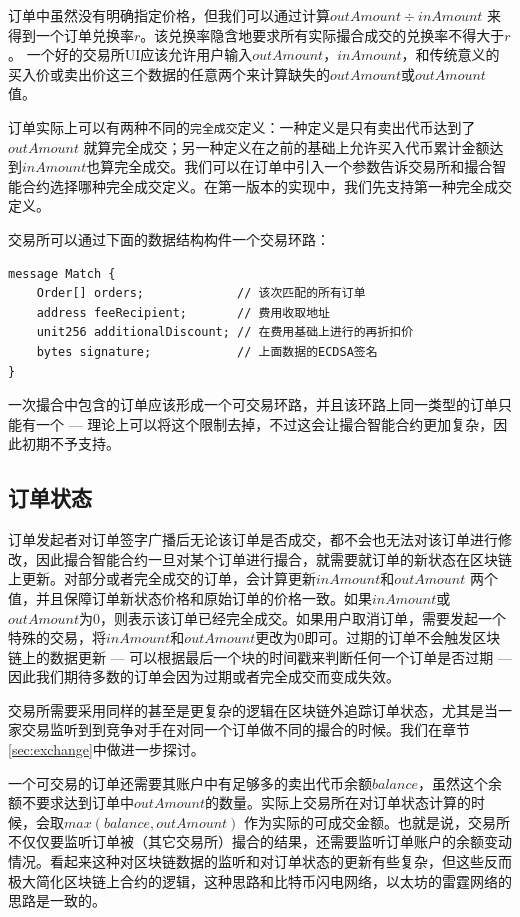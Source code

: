 \documentclass[UTF8,nofonts]{ctexart}
\begin{document}
订单中虽然没有明确指定价格，但我们可以通过计算$outAmount \div inAmount$ 来得到一个订单兑换率$r$。该兑换率隐含地要求所有实际撮合成交的兑换率不得大于$r$。 一个好的交易所UI应该允许用户输入$outAmount$，$inAmount$，和传统意义的买入价或卖出价这三个数据的任意两个来计算缺失的$outAmount$或$outAmount$值。

订单实际上可以有两种不同的\texttt{完全成交}定义：一种定义是只有卖出代币达到了$outAmount$ 就算完全成交；另一种定义在之前的基础上允许买入代币累计金额达到$inAmount$也算完全成交。我们可以在订单中引入一个参数告诉交易所和撮合智能合约选择哪种完全成交定义。在第一版本的实现中，我们先支持第一种完全成交定义。


交易所可以通过下面的数据结构构件一个交易环路：
\begin{verbatim}
message Match {
    Order[] orders;             // 该次匹配的所有订单
    address feeRecipient;       // 费用收取地址
    unit256 additionalDiscount; // 在费用基础上进行的再折扣价
    bytes signature;            // 上面数据的ECDSA签名
}
\end{verbatim}

一次撮合中包含的订单应该形成一个可交易环路，并且该环路上同一类型的订单只能有一个 --- 理论上可以将这个限制去掉，不过这会让撮合智能合约更加复杂，因此初期不予支持。

\subsection{订单状态\label{sec:orderstate}}

订单发起者对订单签字广播后无论该订单是否成交，都不会也无法对该订单进行修改，因此撮合智能合约一旦对某个订单进行撮合，就需要就订单的新状态在区块链上更新。对部分或者完全成交的订单，会计算更新$inAmount$和$outAmount$ 两个值，并且保障订单新状态价格和原始订单的价格一致。如果$inAmount$或$outAmount$为0，则表示该订单已经完全成交。如果用户取消订单，需要发起一个特殊的交易，将$inAmount$和$outAmount$更改为0即可。过期的订单不会触发区块链上的数据更新 --- 可以根据最后一个块的时间戳来判断任何一个订单是否过期 --- 因此我们期待多数的订单会因为过期或者完全成交而变成失效。

交易所需要采用同样的甚至是更复杂的逻辑在区块链外追踪订单状态，尤其是当一家交易监听到到竞争对手在对同一个订单做不同的撮合的时候。我们在章节\ref{sec:exchange}中做进一步探讨。

一个可交易的订单还需要其账户中有足够多的卖出代币余额$balance$，虽然这个余额不要求达到订单中$outAmount$的数量。实际上交易所在对订单状态计算的时候，会取$max(balance, outAmount)$ 作为实际的可成交金额。也就是说，交易所不仅仅要监听订单被（其它交易所）撮合的结果，还需要监听订单账户的余额变动情况。看起来这种对区块链数据的监听和对订单状态的更新有些复杂，但这些反而极大简化区块链上合约的逻辑，这种思路和比特币闪电网络，以太坊的雷霆网络的思路是一致的。
\end{document}
